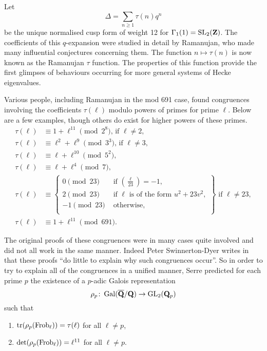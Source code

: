 \documentclass[a4paper,12pt]{article}
\begin{document}
\begin{ex}\label{ex:delt}
Let
\[
\Delta = \sum_{n \ge 1} \tau(n) q^n
\]
be the unique normalised cusp form of weight 12 for $\Gamma_1(1) = \operatorname{SL}_2(\mathbf{Z})$.
The coefficients of this $q$-expansion were studied in detail by Ramanujan, who made many influential conjectures concerning them.
The function $n \mapsto \tau(n)$ is now known as the Ramanujan $\tau$ function.
The properties of this function provide the first glimpses of behaviours occurring for more general systems of Hecke eigenvalues.

Various people, including Ramanujan in the mod 691 case, found congruences involving the coefficients $\tau(\ell)$ modulo powers of primes for prime $\ell$.
Below are a few examples, though others do exist for higher powers of these primes.
\begin{align}
\tau(\ell) &\equiv 1 + \ell^{11} \pmod{2^8}\text{, if } \ell \ne 2,\label{eq:tau2}\\
\tau(\ell) &\equiv \ell^2 + \ell^9 \pmod{3^3}\text{, if } \ell \ne 3,\label{eq:tau3}\\
\tau(\ell) &\equiv \ell + \ell^{10} \pmod{5^2},\label{eq:tau5}\\
\tau(\ell) &\equiv \ell + \ell^4 \pmod{7},\label{eq:tau7}\\
\tau(\ell) &\equiv\left.\begin{cases}
0\pmod{23} & \text{ if } \left(\frac{\ell}{23}\right) = -1,\\
2\pmod{23} & \text{ if }\ell\text{ is of the form } u^2 + 23v^2,\\
-1\pmod{23} & \text{ otherwise},\\
\end{cases}\right\}\text{ if } \ell \ne 23,\label{eq:tau23}\\
\tau(\ell) &\equiv 1 + \ell^{11} \pmod{691}.\label{eq:tau691}
\end{align}

The original proofs of these congruences were in many cases quite involved and did not all work in the same manner.
Indeed Peter Swinnerton-Dyer writes in \cite{SD} that these proofs ``do little to explain why such congruences occur''.
So in order to try to explain all of the congruences in a unified manner, Serre predicted \cite{Serre67} for each prime $p$ the existence of a $p$-adic Galois representation
\[
\rho_p\colon \operatorname{Gal}(\overline{\mathbf{Q}}/\mathbf{Q}) \to \operatorname{GL}_2(\mathbf{Q}_p)
\]
such that
\begin{enumerate}
\item $\operatorname{tr}(\rho_p (\operatorname{Frob}_\ell)) = \tau(\ell)$ for all $\ell \ne p$,\label{item:trace}
\item $\det(\rho_p (\operatorname{Frob}_\ell)) = \ell^{11}$ for all $\ell \ne p$.\label{item:det}
\end{enumerate}


\end{ex}
\end{document}
